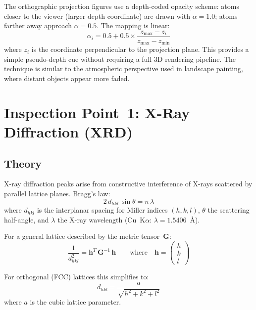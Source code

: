 \documentclass[11pt,a4paper]{article}
\begin{document}
The orthographic projection figures use a depth-coded opacity scheme:
atoms closer to the viewer (larger depth coordinate) are drawn with
$\alpha = 1.0$; atoms farther away approach $\alpha = 0.5$.  The
mapping is linear:
\begin{equation}
  \alpha_i = 0.5 + 0.5 \times \frac{z_{\max} - z_i}{z_{\max} - z_{\min}}
\end{equation}
where $z_i$ is the coordinate perpendicular to the projection plane.
This provides a simple pseudo-depth cue without requiring a full 3D
rendering pipeline.  The technique is similar to the atmospheric
perspective used in landscape painting, where distant objects appear
more faded.

\section{Inspection Point~1: X-Ray Diffraction (XRD)}
\label{sec:xrd}

\subsection{Theory}

X-ray diffraction peaks arise from constructive interference of X-rays
scattered by parallel lattice planes.  Bragg's law:
\begin{equation}
  2\,d_{hkl}\,\sin\theta = n\,\lambda
  \label{eq:bragg}
\end{equation}
where $d_{hkl}$ is the interplanar spacing for Miller indices $(h,k,l)$,
$\theta$ the scattering half-angle, and $\lambda$ the X-ray wavelength
(Cu~K$\alpha$: $\lambda = 1.5406$~\AA).

For a general lattice described by the metric tensor~$\mathbf{G}$:
\begin{equation}
  \frac{1}{d_{hkl}^{2}} = \bm{h}^{T}\,\mathbf{G}^{-1}\,\bm{h}
  \qquad\text{where}\quad
  \bm{h} = \begin{pmatrix} h \\ k \\ l \end{pmatrix}
  \label{eq:metric}
\end{equation}

For orthogonal (FCC) lattices this simplifies to:
\begin{equation}
  d_{hkl} = \frac{a}{\sqrt{h^{2}+k^{2}+l^{2}}}
\end{equation}
where $a$ is the cubic lattice parameter.
\end{document}

